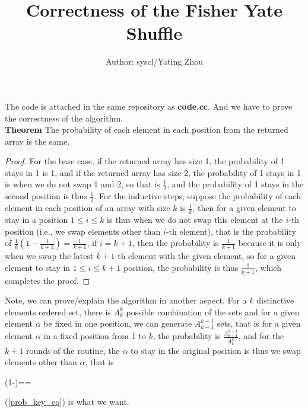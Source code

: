 \documentclass[10pt]{article}
\begin{document}
	\title{%
		\textbf{Correctness of the Fisher Yate Shuffle}} 
		\author{
			Author: syscl/Yating Zhou\\ 
		}
	\maketitle
		The code is attached in the same repository as \textbf{code.cc}. And we have to prove the correctness of the algorithm.\\
		\textbf{Theorem} The probability of each element in each position from the returned array is the same. 
		\begin{proof}
			For the base case, if the returned array has size 1, the probability of 1 stays in 1 is 1, and if the returned array has size 2, the probability of 1 stays in 1 is when we do not swap 1 and 2, so that is $\frac{1}{2}$, and the probability of 1 stays in the second position is thus $\frac{1}{2}$. For the inductive steps, suppose the probability of each element in each position of an array with size $k$ is $\frac{1}{k}$, then for a given element to stay in a position $1\leq i\leq k$ is thus when we do not swap this element at the $i$-th position (i.e., we swap elements other than $i$-th element), that is the probability of $\frac{1}{k}(1-\frac{1}{k+1})=\frac{1}{k+1}$, if $i=k+1$, then the probability is $\frac{1}{k+1}$ because it is only when we swap the latest $k+1$-th element with the given element, so for a given element to stay in $1\leq i \leq k+1$ position, the probability is thus $\frac{1}{k+1}$, which completes the proof.
		\end{proof} 
		Note, we can prove/explain the algorithm in another aspect. For a $k$ distinctive elements ordered set, there is $A_{k}^{k}$ possible combination of the sets and for a given element $\alpha$ be fixed in one position, we can generate $A_{k-1}^{k-1}$ sets, that is for a given element $\alpha$ in a fixed position from 1 to $k$, the probability is $\frac{A_{k-1}^{k-1}}{A_{k}^{k}}$, and for the $k+1$ rounds of the routine, the $\alpha$ to stay in the original position is thus we swap elements other than $\alpha$, that is 
		\begin{flalign}\label{prob_key_eq}
			 (1-)==
		\end{flalign}
		(\ref{prob_key_eq}) is what we want.
		
	
\end{document}
